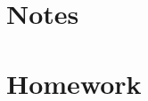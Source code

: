 \documentclass[letterpaper,12pt]{report}
\begin{document}
\maketitle

\part{Notes}




\part{Homework}


\end{document}

